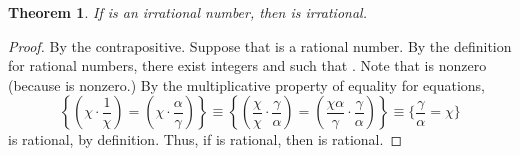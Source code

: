 \documentclass[preview]{standalone}
\newtheorem{theorem}{Theorem}
\begin{document}
\begin{theorem} %
    If \bm{$\chi$} is an irrational number, 
    then  is irrational.
\end{theorem}

\begin{proof}
    By the contrapositive. 
    Suppose that  is a rational number. 
    By the definition for rational numbers, 
    there exist integers \bm{$\alpha$} and \bm{$\gamma$} such that 
    . 
    Note that \bm{$\alpha$} is nonzero (because  is nonzero.) 
    By the multiplicative property of equality for equations,
    \begin{equation*}
        \left\{
            \left(
                \chi \cdot \frac{1}{\chi}
            \right) 
                = 
            \left(
                \chi \cdot \frac{\alpha}{\gamma}
            \right)
        \right\} 
            \equiv
        \left\{
            \left(
                \frac{\chi}{\chi} \cdot \frac{\gamma}{\alpha}
            \right) 
                = 
            \left(
                \frac{\chi \alpha}{\gamma} \cdot \frac{\gamma}{\alpha}
            \right)
        \right\} 
            \equiv
        \bigg\{
            \frac{\gamma}{\alpha} 
                = 
            \chi
        \bigg\}
    \end{equation*}
    \bm{$\frac{\gamma}{\alpha} = \chi$} is rational, 
    by definition. 
    Thus, if  is rational, 
    then \bm{$\chi$} is rational.
\color{lightgray} \end{proof}
\
\end{document}
